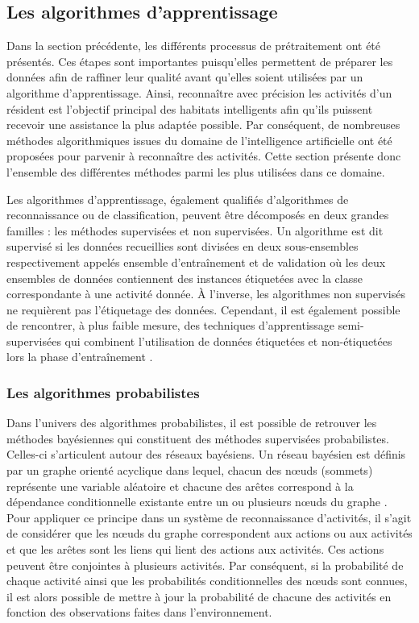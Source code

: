 \subsection{Les algorithmes d'apprentissage}
\label{sec:algos}

Dans la section précédente, les différents processus de prétraitement ont été présentés. Ces étapes sont importantes puisqu'elles permettent de préparer les données afin de raffiner leur qualité avant qu'elles soient utilisées par un algorithme d'apprentissage. Ainsi, reconnaître avec précision les activités d'un résident est l'objectif principal des habitats intelligents afin qu'ils puissent recevoir une assistance la plus adaptée possible. Par conséquent, de nombreuses méthodes algorithmiques issues du domaine de l'intelligence artificielle ont été proposées pour parvenir à reconnaître des activités. Cette section présente donc l'ensemble des différentes méthodes parmi les plus utilisées dans ce domaine.

Les algorithmes d'apprentissage, également qualifiés d'algorithmes de reconnaissance ou de classification, peuvent être décomposés en deux grandes familles : les méthodes supervisées et non supervisées. Un algorithme est dit supervisé si les données recueillies sont divisées en deux sous-ensembles respectivement appelés ensemble d'entraînement et de validation où les deux ensembles de données contiennent des instances étiquetées avec la classe correspondante à une activité donnée. À l'inverse, les algorithmes non supervisés ne requièrent pas l'étiquetage des données. Cependant, il est également possible de rencontrer, à plus faible mesure, des techniques d'apprentissage semi-supervisées qui combinent l'utilisation de données étiquetées et non-étiquetées lors la phase d'entraînement \citep{Zhu2005, Chapelle2006}.

\subsubsection{Les algorithmes probabilistes}

Dans l'univers des algorithmes probabilistes, il est possible de retrouver les méthodes bayésiennes qui constituent des méthodes supervisées probabilistes. Celles-ci s'articulent autour des réseaux bayésiens. Un réseau bayésien est définis par un graphe orienté acyclique dans lequel, chacun des n\oe{}uds (sommets) représente une variable aléatoire et chacune des arêtes correspond à la dépendance conditionnelle existante entre un ou plusieurs n\oe{}uds du graphe \citep{Heckerman1995}. Pour appliquer ce principe dans un système de reconnaissance d'activités, il s'agit de considérer que les n\oe{}uds du graphe correspondent aux actions ou aux activités et que les arêtes sont les liens qui lient des actions aux activités. Ces actions peuvent être conjointes à plusieurs activités. Par conséquent, si la probabilité de chaque activité ainsi que les probabilités conditionnelles des n\oe{}uds sont connues, il est alors possible de mettre à jour la probabilité de chacune des activités en fonction des observations faites dans l'environnement.

